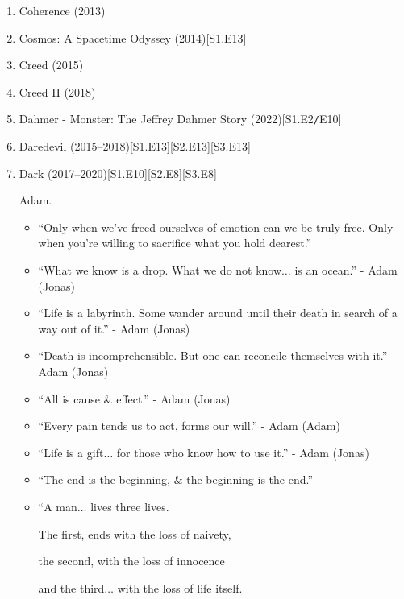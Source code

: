 \documentclass{article}
\begin{document}
\begin{enumerate}
	\item {\sc Coherence} (2013)
	\item {\sc Cosmos: A Spacetime Odyssey} (2014)\hfill[S1.E13]
	\item {\sc Creed} (2015)
	\item {\sc Creed II} (2018)
	\item Dahmer - Monster: The Jeffrey Dahmer Story (2022)\hfill[S1.E2{\tt/}E10]
	\item {\sc Daredevil} (2015--2018)\hfill[S1.E13][S2.E13][S3.E13]
	\item {\sc Dark} (2017--2020)\hfill[S1.E10][S2.E8][S3.E8]
	
	{\sc Adam.}
	\begin{itemize}
		\item ``Only when we've freed ourselves of emotion can we be truly free. Only when you're willing to sacrifice what you hold dearest.''
		\item ``What we know is a drop. What we do not know$\ldots$ is an ocean.'' - Adam (Jonas)
		\item ``Life is a labyrinth. Some wander around until their death in search of a way out of it.'' - Adam (Jonas)
		\item ``Death is incomprehensible. But one can reconcile themselves with it.'' - Adam (Jonas)
		\item ``All is cause \& effect.'' - Adam (Jonas)
		\item ``Every pain tends us to act, forms our will.'' - Adam (Adam)
		\item ``Life is a gift$\ldots$ for those who know how to use it.'' - Adam (Jonas)
		\item ``The end is the beginning, \& the beginning is the end.''
		\item ``A man$\ldots$ lives three lives.
		
		The first, ends with the loss of naivety,
		
		the second, with the loss of innocence
		
		and the third$\ldots$ with the loss of life itself.
		

\end{itemize}
\end{enumerate}
\end{document}
